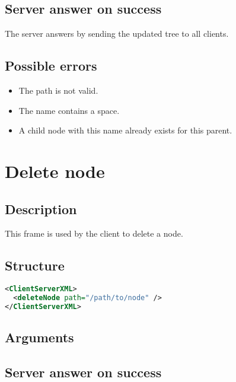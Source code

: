\subsection{Server answer on success}

The server answers by sending the updated tree  to all
clients.

\subsection{Possible errors}

\begin{itemize}
 \item The path is not valid.
 \item The name contains a space.
 \item A child node with this name already exists for this parent.
\end{itemize}


\section{Delete node}
\label{deleteNode}

\subsection{Description}

This frame is used by the client to delete a node.

\subsection{Structure}

\begin{lstlisting}[language=XML]
<ClientServerXML>
  <deleteNode path="/path/to/node" />
</ClientServerXML>
\end{lstlisting}

\subsection{Arguments}

\subsection{Server answer on success}

